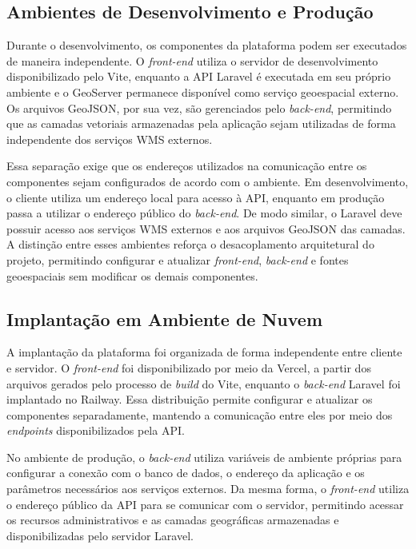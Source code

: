 \subsection{Ambientes de Desenvolvimento e Produção}
\label{sec:ambientes-execucao}

Durante o desenvolvimento, os componentes da plataforma podem ser executados de maneira independente. O \textit{front-end} utiliza o servidor de desenvolvimento disponibilizado pelo Vite, enquanto a API Laravel é executada em seu próprio ambiente e o GeoServer permanece disponível como serviço geoespacial externo. Os arquivos GeoJSON, por sua vez, são gerenciados pelo \textit{back-end}, permitindo que as camadas vetoriais armazenadas pela aplicação sejam utilizadas de forma independente dos serviços WMS externos.

Essa separação exige que os endereços utilizados na comunicação entre os componentes sejam configurados de acordo com o ambiente. Em desenvolvimento, o cliente utiliza um endereço local para acesso à API, enquanto em produção passa a utilizar o endereço público do \textit{back-end}. De modo similar, o Laravel deve possuir acesso aos serviços WMS externos e aos arquivos GeoJSON das camadas. A distinção entre esses ambientes reforça o desacoplamento arquitetural do projeto, permitindo configurar e atualizar \textit{front-end}, \textit{back-end} e fontes geoespaciais sem modificar os demais componentes.

\subsection{Implantação em Ambiente de Nuvem}
\label{sec:implantacao-nuvem}

A implantação da plataforma foi organizada de forma independente entre cliente e servidor. O \textit{front-end} foi disponibilizado por meio da Vercel, a partir dos arquivos gerados pelo processo de \textit{build} do Vite, enquanto o \textit{back-end} Laravel foi implantado no Railway. Essa distribuição permite configurar e atualizar os componentes separadamente, mantendo a comunicação entre eles por meio dos \textit{endpoints} disponibilizados pela API.

No ambiente de produção, o \textit{back-end} utiliza variáveis de ambiente próprias para configurar a conexão com o banco de dados, o endereço da aplicação e os parâmetros necessários aos serviços externos. Da mesma forma, o \textit{front-end} utiliza o endereço público da API para se comunicar com o servidor, permitindo acessar os recursos administrativos e as camadas geográficas armazenadas e disponibilizadas pelo servidor Laravel.

